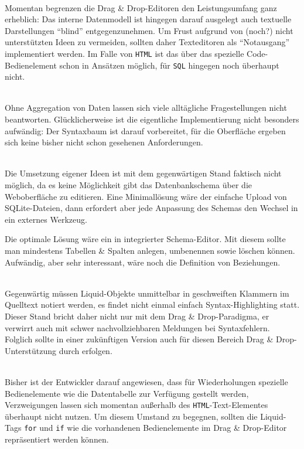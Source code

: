 \begin{description}[noitemsep]
\item[Allgemein: Textuelle Editoren] \hfill\\
  Momentan begrenzen die Drag \& Drop-Editoren den Leistungsumfang ganz erheblich: Das interne Datenmodell ist hingegen darauf ausgelegt auch textuelle Darstellungen "`blind"' entgegenzunehmen. Um Frust aufgrund von (noch?) nicht unterstützten Ideen zu vermeiden, sollten daher Texteditoren als "`Notausgang"' implementiert werden. Im Falle von \texttt{HTML} ist das über das spezielle Code-Bedienelement schon in Ansätzen möglich, für \texttt{SQL} hingegen noch überhaupt nicht.
  
\item[SQL: Unterstützung für Funktionen und \texttt{GROUP BY}] \hfill\\
  Ohne Aggregation von Daten lassen sich viele alltägliche Fragestellungen nicht beantworten. Glücklicherweise ist die eigentliche Implementierung nicht besonders aufwändig: Der Syntaxbaum ist darauf vorbereitet, für die Oberfläche ergeben sich keine bisher nicht schon gesehenen Anforderungen.
  
\item[SQL: Schemaeditor] \hfill\\
  Die Umsetzung eigener Ideen ist mit dem gegenwärtigen Stand faktisch nicht möglich, da es keine Möglichkeit gibt das Datenbankschema über die Weboberfläche zu editieren. Eine Minimallösung wäre der einfache Upload von SQLite-Dateien, dann erfordert aber jede Anpassung des Schemas den Wechsel in ein externes Werkzeug.

  Die optimale Lösung wäre ein in \idename{} integrierter Schema-Editor. Mit diesem sollte man mindestens Tabellen \& Spalten anlegen, umbenennen sowie löschen können. Aufwändig, aber sehr interessant, wäre noch die Definition von Beziehungen.

\item[Seiten: Drag \& Drop für interpolierte Ausdrücke] \hfill\\
  Gegenwärtig müssen Liquid-Objekte unmittelbar in geschweiften Klammern im Quelltext notiert werden, es findet nicht einmal einfach Syntax-Highlighting statt. Dieser Stand bricht daher nicht nur mit dem Drag \& Drop-Paradigma, er verwirrt auch mit schwer nachvollziehbaren Meldungen bei Syntaxfehlern. Folglich sollte in einer zukünftigen Version auch für diesen Bereich Drag \& Drop-Unterstützung durch \idename{} erfolgen.
  
\item[Seiten: Drag \& Drop für Kontrollstrukturen] \hfill\\
  Bisher ist der Entwickler darauf angewiesen, dass für Wiederholungen spezielle Bedienelemente wie die Datentabelle zur Verfügung gestellt werden, Verzweigungen lassen sich momentan außerhalb des \texttt{HTML}-Text-Elementes überhaupt nicht nutzen. Um diesem Umstand zu begegnen, sollten die Liquid-Tags \texttt{for} und \texttt{if} wie die vorhandenen Bedienelemente im Drag \& Drop-Editor repräsentiert werden können.  
\end{description}

